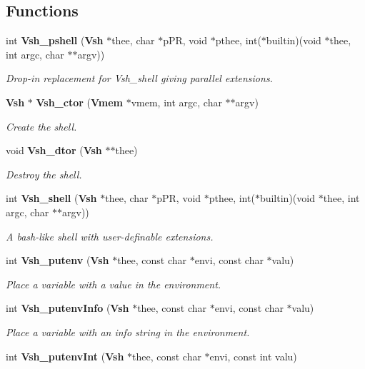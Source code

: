 \subsection*{Functions}
\begin{DoxyCompactItemize}
\item 
int {\bf Vsh\-\_\-pshell} ({\bf Vsh} $\ast$thee, char $\ast$p\-P\-R, void $\ast$pthee, int($\ast$builtin)(void $\ast$thee, int argc, char $\ast$$\ast$argv))
\begin{DoxyCompactList}\small\item\em Drop-\/in replacement for Vsh\-\_\-shell giving parallel extensions. \end{DoxyCompactList}\item 
{\bf Vsh} $\ast$ {\bf Vsh\-\_\-ctor} ({\bf Vmem} $\ast$vmem, int argc, char $\ast$$\ast$argv)
\begin{DoxyCompactList}\small\item\em Create the shell. \end{DoxyCompactList}\item 
void {\bf Vsh\-\_\-dtor} ({\bf Vsh} $\ast$$\ast$thee)
\begin{DoxyCompactList}\small\item\em Destroy the shell. \end{DoxyCompactList}\item 
int {\bf Vsh\-\_\-shell} ({\bf Vsh} $\ast$thee, char $\ast$p\-P\-R, void $\ast$pthee, int($\ast$builtin)(void $\ast$thee, int argc, char $\ast$$\ast$argv))
\begin{DoxyCompactList}\small\item\em A bash-\/like shell with user-\/definable extensions. \end{DoxyCompactList}\item 
int {\bf Vsh\-\_\-putenv} ({\bf Vsh} $\ast$thee, const char $\ast$envi, const char $\ast$valu)
\begin{DoxyCompactList}\small\item\em Place a variable with a value in the environment. \end{DoxyCompactList}\item 
int {\bf Vsh\-\_\-putenv\-Info} ({\bf Vsh} $\ast$thee, const char $\ast$envi, const char $\ast$valu)
\begin{DoxyCompactList}\small\item\em Place a variable with an info string in the environment. \end{DoxyCompactList}\item 
int {\bf Vsh\-\_\-putenv\-Int} ({\bf Vsh} $\ast$thee, const char $\ast$envi, const int valu)

\end{DoxyCompactItemize}
